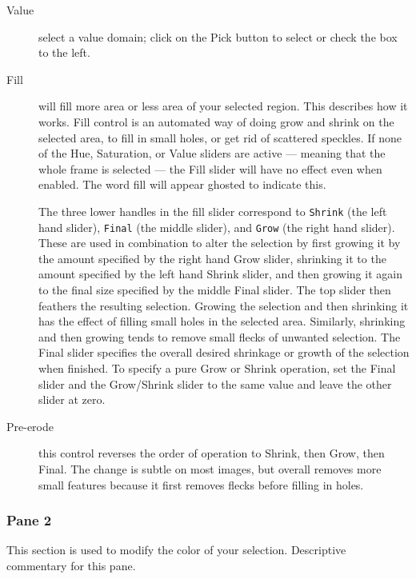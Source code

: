\begin{description}
    \item[Value] select a value domain; click on the Pick button to select or check the box to the left.
    \item[Fill] will fill more area or less area of your selected region. This describes how it works. Fill control is an automated way of doing grow and shrink on the selected area, to fill in small holes, or get rid of scattered speckles. If none of the Hue, Saturation, or Value sliders are active --- meaning that the whole frame is selected --- the Fill slider will have no effect even when enabled. The word fill will appear ghosted to indicate this.
    
    The three lower handles in the fill slider correspond to \texttt{Shrink} (the left hand slider), \texttt{Final} (the middle slider), and \texttt{Grow} (the right hand slider). These are used in combination to alter the selection by first growing it by the amount specified by the right hand Grow slider, shrinking it to the amount specified by the left hand Shrink slider, and then growing it again to the final size specified by the middle Final slider. The top slider then feathers the resulting selection.
    Growing the selection and then shrinking it has the effect of filling small holes in the selected area. Similarly, shrinking and then growing tends to remove small flecks of unwanted selection. The Final slider specifies the overall desired shrinkage or growth of the selection when finished. To specify a pure Grow or Shrink operation, set the Final slider and the Grow/Shrink slider to the same value and leave the other slider at zero.
    \item[Pre-erode] this control reverses the order of operation to Shrink, then Grow, then Final. The change is subtle on most images, but overall removes more small features because it first removes flecks before filling in holes.
\end{description}

\subsubsection*{Pane 2}
\label{ssub:pane1}

This section is used to modify the color of your selection. Descriptive commentary for this pane.

